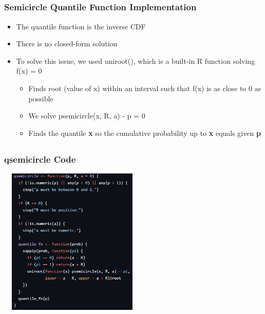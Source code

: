\documentclass[handout, xcolor=dvipsnames]{beamer}
\begin{document}
\subsection{}
\begin{frame}
	\frametitle{Semicircle Quantile Function Implementation}
        \begin{itemize}
            \item The quantile function is the inverse CDF
            \item There is no closed-form solution
            \item To solve this issue, we used uniroot(), which is a built-in R function solving f(x) = 0
            \begin{itemize}
                \item Finds root (value of x) within an interval such that f(x) is as close to 0 as possible
                \item We solve psemicircle(x, R, a) - p = 0
                \item Finds the quantile \textbf{x} so the cumulative probability up to \textbf{x} equals given \textbf{p}
            \end{itemize}
        \end{itemize}
\end{frame}


\subsection{}
\begin{frame}
	\frametitle{qsemicircle Code}
        \begin{center}
            \includegraphics[width=7cm,height=7cm]{Figures/qsemi_code.png}
        \end{center}
\end{frame}
\end{document}
